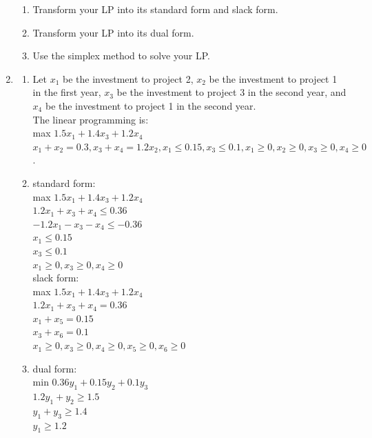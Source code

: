 \documentclass[12pt,a4paper]{article}
\makeatletter
\newtheorem*{solution}{Solution}
\theoremstyle{definition}
\renewenvironment{solution}[1][Solution] {\par\pushQED{\qed}\normalfont\topsep6\p@\@plus6\p@\relax\trivlist\item[\hskip\labelsep\bfseries#1\@addpunct{.}]\ignorespaces}{\popQED\endtrivlist\@endpefalse} \makeatother
\makeatother
\begin{document}
\begin{enumerate}
\begin{enumerate}
    \item
    Transform your LP into its standard form and slack form.

    \item
    Transform your LP into its dual form.

    \item
    Use the simplex method to solve your LP.
    \end{enumerate}
    
    \begin{solution}
      \begin{enumerate}
        \item Let $x_1$ be the investment to project 2, $x_2$ be the investment to project 1 in the first year, $x_3$ be the investment to project 3 in the second year, and $x_4$ be the investment to project 1 in the second year.
        \\ The linear programming is:
        \\ max $1.5x_1+1.4x_3+1.2x_4$
        \\$x_1+x_2=0.3, x_3+x_4=1.2x_2, x_1\leqslant 0.15, x_3\leqslant 0.1, x_1\geqslant 0, x_2\geqslant 0, x_3\geqslant 0, x_4\geqslant 0$.
        \item standard form:
        \\ max $1.5x_1+1.4x_3+1.2x_4$
        \\ $1.2x_1+x_3+x_4\leqslant 0.36$
        \\ $-1.2x_1-x_3-x_4\leqslant -0.36$
        \\ $x_1\leqslant 0.15$
        \\ $x_3\leqslant 0.1$
        \\ $x_1\geqslant 0, x_3\geqslant 0, x_4\geqslant 0$
        \\ slack form:
        \\ max $1.5x_1+1.4x_3+1.2x_4$
        \\ $1.2x_1+x_3+x_4 = 0.36$
        \\ $x_1 + x_5 = 0.15$
        \\ $x_3 + x_6 = 0.1$
        \\ $x_1\geqslant 0, x_3\geqslant 0, x_4\geqslant 0, x_5\geqslant 0, x_6\geqslant 0$
        \item dual form:
        \\ min $0.36y_1+0.15y_2+0.1y_3$
        \\ $1.2y_1+y_2\geqslant 1.5$
        \\ $y_1+y_3\geqslant 1.4$
        \\ $y_1\geqslant 1.2$

\end{enumerate}
\end{solution}
\end{enumerate}
\end{document}
